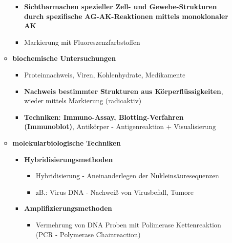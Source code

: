 \begin{itemize}
\begin{itemize}
					\begin{itemize}
						\item \textbf{Sichtbarmachen spezieller Zell- und Gewebe-Strukturen durch spezifische AG-AK-Reaktionen mittels monoklonaler AK}
						\item Markierung mit Fluoreszenzfarbstoffen
					\end{itemize}
				\item \textbf{biochemische Untersuchungen}
					\begin{itemize}
						\item Proteinnachweis, Viren, Kohlenhydrate, Medikamente
						\item \textbf{Nachweis bestimmter Strukturen aus Körperflüssigkeiten}, wieder mittels Markierung (radioaktiv)
						\item \textbf{Techniken: Immuno-Assay, Blotting-Verfahren (Immunoblot)}, Antikörper - Antigenreaktion + Visualisierung
					\end{itemize}
				\item \textbf{molekularbiologische Techniken}
					\begin{itemize}
						\item \textbf{Hybridisierungsmethoden}
							\begin{itemize}
								\item Hybridisierung - Aneinanderlegen der Nukleinsäuresequenzen
								\item zB.: Virus DNA - Nachweiß von Virusbefall, Tumore
							\end{itemize}
						\item \textbf{Amplifizierungsmethoden}
							\begin{itemize}
								\item Vermehrung von DNA Proben mit Polimerase Kettenreaktion (PCR - Polymerase Chainreaction)
							\end{itemize}
					\end{itemize}
		\end{itemize}
	\end{itemize}

\pagebreak
